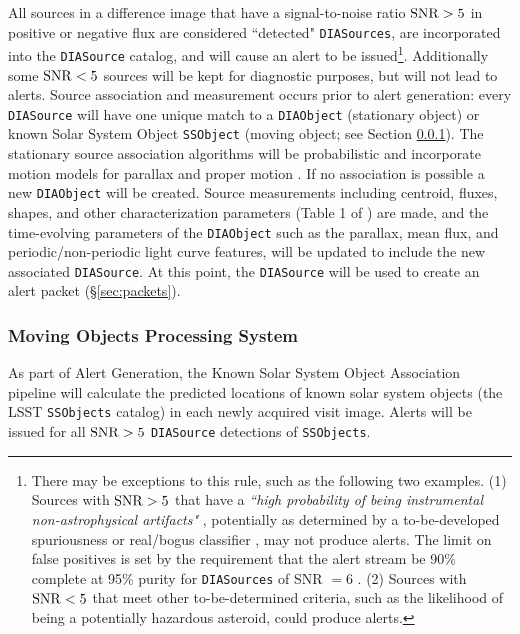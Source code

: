 All sources in a difference image that have a signal-to-noise ratio ${\rm SNR}>5$ in positive or negative flux are considered ``detected" \texttt{DIASources}, are incorporated into the {\tt DIASource} catalog, and will cause an alert to be issued\footnote{
There may be exceptions to this rule, such as the following two examples.
(1) Sources with ${\rm SNR} > 5$ that have a {\it ``high probability of being instrumental non-astrophysical artifacts"} , potentially as determined by 
a to-be-developed spuriousness or real/bogus classifier , may not produce alerts.  
The limit on false positives is set by the requirement that the alert stream be 90\% complete at 95\% purity for \texttt{DIASources} of SNR $= 6$ .
(2) Sources with ${\rm SNR} < 5$ that meet other to-be-determined criteria, such as the likelihood of being a potentially hazardous asteroid, could produce alerts.}.
Additionally some ${\rm SNR} < 5$ sources will be kept for diagnostic purposes, but will not lead to alerts.
Source association and measurement occurs prior to alert generation: every {\tt DIASource} will have one unique match to a {\tt DIAObject} (stationary object) or known Solar System Object {\tt SSObject} (moving object; see Section \ref{sec:AGP_MOPS}).
The stationary source association algorithms will be probabilistic and incorporate motion models for parallax and proper motion .
If no association is possible a new {\tt DIAObject} will be created.
Source measurements including centroid, fluxes, shapes, and other characterization parameters (Table 1 of ) are made, and the time-evolving parameters of the {\tt DIAObject} such as the parallax, mean flux, and periodic/non-periodic light curve features, will be updated to include the new associated {\tt DIASource}.
At this point, the {\tt DIASource} will be used to create an alert packet (\S \ref{sec:packets}).

\subsubsection{Moving Objects Processing System}\label{sec:AGP_MOPS}


As part of Alert Generation, the Known Solar System Object Association pipeline will calculate the predicted locations of known solar system objects (the LSST {\tt SSObjects} catalog) in each newly acquired visit image. 
Alerts will be issued for all ${\rm SNR} > 5$ \texttt{DIASource} detections of \texttt{SSObjects}.

